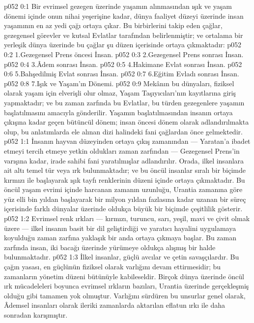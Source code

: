 \vs p052 0:1 Bir evrimsel gezegen üzerinde yaşamın alınmasından ışık ve yaşam dönemi içinde onun nihai yeşerişine kadar, dünya faaliyet düzeyi üzerinde insan yaşamının en az yedi çağı ortaya çıkar. Bu birbirlerini takip eden çağlar, gezegensel görevler ve kutsal Evlatlar tarafından belirlenmiştir; ve ortalama bir yerleşik dünya üzerinde bu çağlar şu düzen içerisinde ortaya çıkmaktadır:
\vs p052 0:2 1.\bibnobreakspace Gezegensel Prens öncesi İnsan.
\vs p052 0:3 2.\bibnobreakspace Gezegensel Prens sonrası İnsan.
\vs p052 0:4 3.\bibnobreakspace Âdem sonrası İnsan.
\vs p052 0:5 4.\bibnobreakspace Hakimane Evlat sonrası İnsan.
\vs p052 0:6 5.\bibnobreakspace Bahşedilmiş Evlat sonrası İnsan.
\vs p052 0:7 6.\bibnobreakspace Eğitim Evladı sonrası İnsan.
\vs p052 0:8 7.\bibnobreakspace Işık ve Yaşam’ın Dönemi.
\vs p052 0:9 Mekânın bu dünyaları, fiziksel olarak yaşam için elverişli olur olmaz, Yaşam Taşıyıcıları’nın kayıtlarına giriş yapmaktadır; ve bu zaman zarfında bu Evlatlar, bu türden gezegenlere yaşamın başlatılmasını amacıyla gönderilir. Yaşamın başlatılmasından insanın ortaya çıkışına kadar geçen bütüncül dönem; insan öncesi dönem olarak adlandırılmakta olup, bu anlatımlarda ele alınan dizi halindeki fani çağlardan önce gelmektedir.
\vs p052 1:1 İnsanın hayvan düzeyinden ortaya çıkış zamanından --- Yaratan’a ibadet etmeyi tercih etmeye yetkin oldukları zaman zarfından --- Gezegensel Prens’in varışına kadar, irade sahibi fani yaratılmışlar  adlandırılır. Orada, ilkel insanlara ait altı temel tür veya ırk bulunmaktadır; ve bu öncül insanlar sıralı bir biçimde kırmızı ile başlayarak ışık tayfı renklerinin düzeni içinde ortaya çıkmaktadır. Bu öncül yaşam evrimi içinde harcanan zamanın uzunluğu, Urantia zamanına göre yüz elli bin yıldan başlayarak bir milyon yıldan fazlasına kadar uzanan bir süreç içerisinde farklı dünyalar üzerinde oldukça büyük bir biçimde çeşitlilik gösterir.
\vs p052 1:2 Evrimsel renk ırkları --- kırmızı, turuncu, sarı, yeşil, mavi ve çivit olmak üzere --- ilkel insanın basit bir dil geliştirdiği ve yaratıcı hayalini uygulamaya koyulduğu zaman zarfına yaklaşık bir anda ortaya çıkmaya başlar. Bu zaman zarfında insan, iki bacağı üzerinde yürümeye oldukça alışmış bir halde bulunmaktadır.
\vs p052 1:3 İlkel insanlar, güçlü avcılar ve çetin savaşçılardır. Bu çağın yasası, en güçlünün fiziksel olarak varlığını devam ettirmesidir; bu zamanların yönetim düzeni bütünüyle kabileseldir. Birçok dünya üzerinde öncül ırk mücadeleleri boyunca evrimsel ırkların bazıları, Urantia üzerinde gerçekleşmiş olduğu gibi tamamen yok olmuştur. Varlığını sürdüren bu unsurlar genel olarak, Âdemsel insanları olarak ileriki zamanlarda aktarılan eflatun ırkı ile daha sonradan karışmıştır.
